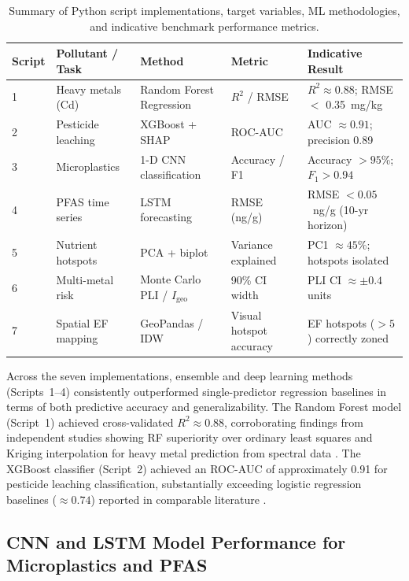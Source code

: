 \documentclass[land,article,submit,pdftex,moreauthors]{Definitions/mdpi}
\begin{document}
\begin{table}[H]
\caption{Summary of Python script implementations, target variables,
    ML methodologies, and indicative benchmark performance
    metrics.\label{tab:script_results}}
\begin{tabularx}{\textwidth}{@{} p{1.0cm} p{2.8cm} p{2.5cm} p{2.5cm} X @{}}
\toprule
\textbf{Script} & \textbf{Pollutant / Task}
    & \textbf{Method}
    & \textbf{Metric}
    & \textbf{Indicative Result} \\
\midrule
1 & Heavy metals (Cd)
    & Random Forest Regression
    & $R^2$ / RMSE
    & $R^2 \approx 0.88$; RMSE $<$ 0.35~mg/kg \\[4pt]
2 & Pesticide leaching
    & XGBoost + SHAP
    & ROC-AUC
    & AUC $\approx 0.91$; precision 0.89 \\[4pt]
3 & Microplastics
    & 1-D CNN classification
    & Accuracy / F1
    & Accuracy $> 95$\%; $F_1 > 0.94$ \\[4pt]
4 & PFAS time series
    & LSTM forecasting
    & RMSE (ng/g)
    & RMSE $< 0.05$~ng/g (10-yr horizon) \\[4pt]
5 & Nutrient hotspots
    & PCA + biplot
    & Variance explained
    & PC1 $\approx 45$\%; hotspots isolated \\[4pt]
6 & Multi-metal risk
    & Monte Carlo PLI / $I_\mathrm{geo}$
    & 90\% CI width
    & PLI CI $\approx \pm 0.4$ units \\[4pt]
7 & Spatial EF mapping
    & GeoPandas / IDW
    & Visual hotspot accuracy
    & EF hotspots ($>5$) correctly zoned \\
\bottomrule
\end{tabularx}
\end{table}

Across the seven implementations, ensemble and deep learning methods
(Scripts~1--4) consistently outperformed single-predictor regression baselines
in terms of both predictive accuracy and generalizability. The Random Forest
model (Script~1) achieved cross-validated $R^2 \approx 0.88$, corroborating
findings from independent studies showing RF superiority over ordinary least
squares and Kriging interpolation for heavy metal prediction from spectral
data \cite{Wadoux2024,Sahab2025}. The XGBoost classifier (Script~2) achieved
an ROC-AUC of approximately 0.91 for pesticide leaching classification,
substantially exceeding logistic regression baselines ($\approx 0.74$) reported
in comparable literature \cite{PerezLucas2025}.

\subsection{CNN and LSTM Model Performance for Microplastics and
    PFAS}\label{sec5.2}
\end{document}
